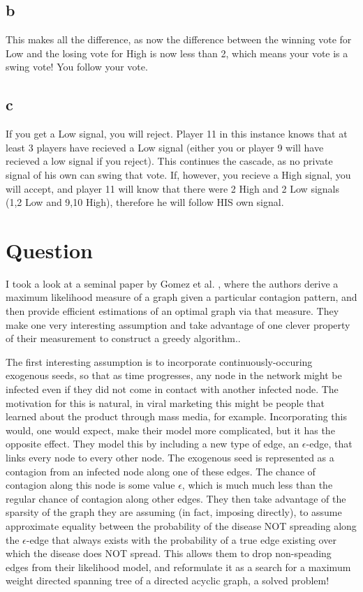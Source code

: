 \documentclass[a4paper,12pt]{article}
\begin{document}
\subsection*{b}
This makes all the difference, as now the difference between the winning vote for Low and the losing vote for High is now less than 2, which means your vote is a swing vote! You follow your vote.

\subsection*{c}
If you get a Low signal, you will reject. Player 11 in this instance knows that at least 3 players have recieved a Low signal (either you or player 9 will have recieved a low signal if you reject). This continues the cascade, as no private signal of his own can swing that vote. If, however, you recieve a High signal, you will accept, and player 11 will know that there were 2 High and 2 Low signals (1,2 Low and 9,10 High), therefore he will follow HIS own signal.


\section*{Question}

I took a look at a seminal paper by Gomez et al. \cite{inferring}, where the authors derive a maximum likelihood measure of a graph given a particular contagion pattern, and then provide efficient estimations of an optimal graph via that measure. They make one very interesting assumption and take advantage of one clever property of their measurement to construct a greedy algorithm..

The first interesting assumption is to incorporate continuously-occuring exogenous seeds, so that as time progresses, any node in the network might be infected even if they did not come in contact with another infected node. The motivation for this is natural, in viral marketing this might be people that learned about the product through mass media, for example. Incorporating this would, one would expect, make their model more complicated, but it has the opposite effect. They model this by including a new type of edge, an $\epsilon$-edge, that links every node to every other node. The exogenous seed is represented as a contagion from an infected node along one of these edges. The chance of contagion along this node is some value $\epsilon$, which is much much less than the regular chance of contagion along other edges. They then take advantage of the sparsity of the graph they are assuming (in fact, imposing directly), to assume approximate equality between the probability of the disease NOT spreading along the $\epsilon$-edge that always exists with the probability of a true edge existing over which the disease does NOT spread. This allows them to drop non-speading edges from their likelihood model, and reformulate it as a search for a maximum weight directed spanning tree of a directed acyclic graph, a solved problem!
\end{document}
